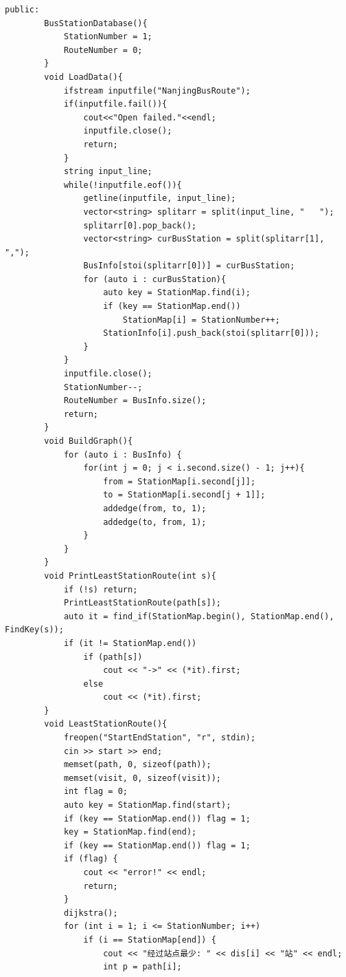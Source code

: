 \documentclass[a4paper,11pt,UTF8]{ctexart}
\begin{document}
\begin{lstlisting}[caption=BusRoute.cpp,captionpos=b]
    public:
        BusStationDatabase(){
            StationNumber = 1;
            RouteNumber = 0;
        }
        void LoadData(){
            ifstream inputfile("NanjingBusRoute");
            if(inputfile.fail()){
                cout<<"Open failed."<<endl;
                inputfile.close();
                return;
            }
            string input_line;
            while(!inputfile.eof()){
                getline(inputfile, input_line);
                vector<string> splitarr = split(input_line, "   ");
                splitarr[0].pop_back();
                vector<string> curBusStation = split(splitarr[1], ",");
                BusInfo[stoi(splitarr[0])] = curBusStation;
                for (auto i : curBusStation){
                    auto key = StationMap.find(i);
                    if (key == StationMap.end())
                        StationMap[i] = StationNumber++;
                    StationInfo[i].push_back(stoi(splitarr[0]));
                }
            }
            inputfile.close();
            StationNumber--;
            RouteNumber = BusInfo.size();
            return;
        }
        void BuildGraph(){
            for (auto i : BusInfo) {
                for(int j = 0; j < i.second.size() - 1; j++){
                    from = StationMap[i.second[j]];
                    to = StationMap[i.second[j + 1]];
                    addedge(from, to, 1);
                    addedge(to, from, 1);
                }
            }
        }
        void PrintLeastStationRoute(int s){
            if (!s) return;
            PrintLeastStationRoute(path[s]);
            auto it = find_if(StationMap.begin(), StationMap.end(), FindKey(s));
            if (it != StationMap.end())
                if (path[s])
                    cout << "->" << (*it).first;
                else
                    cout << (*it).first;
        }
        void LeastStationRoute(){
            freopen("StartEndStation", "r", stdin);
            cin >> start >> end;
            memset(path, 0, sizeof(path));
            memset(visit, 0, sizeof(visit));
            int flag = 0;
            auto key = StationMap.find(start);
            if (key == StationMap.end()) flag = 1;
            key = StationMap.find(end);
            if (key == StationMap.end()) flag = 1;
            if (flag) {
                cout << "error!" << endl;
                return;
            }
            dijkstra();
            for (int i = 1; i <= StationNumber; i++)
                if (i == StationMap[end]) {
                    cout << "经过站点最少: " << dis[i] << "站" << endl;
                    int p = path[i];

\end{lstlisting}
\end{document}
